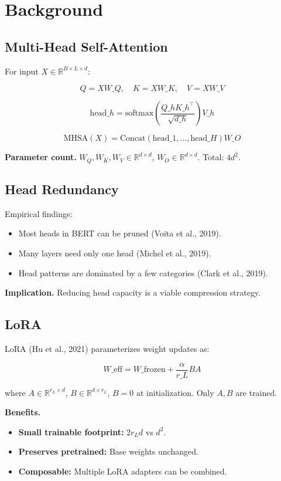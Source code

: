 
\section{Background}

\subsection{Multi-Head Self-Attention}

For input $X \in \mathbb{R}^{B \times L \times d}$:

\[
Q = X W\_Q, \quad K = X W\_K, \quad V = X W\_V
\]

\[
\text{head}\_h = \text{softmax}\!\left(\frac{Q\_h K\_h^\top}{\sqrt{d\_h}}\right) V\_h
\]

\[
\text{MHSA}(X) = \text{Concat}(\text{head}\_1, \dots, \text{head}\_H) W\_O
\]

\textbf{Parameter count.} $W_Q, W_K, W_V \in \mathbb{R}^{d \times d}$, 
$W_O \in \mathbb{R}^{d \times d}$. Total: $4 d^2$.

\subsection{Head Redundancy}

Empirical findings:

\begin{itemize}
\item Most heads in BERT can be pruned (Voita et al., 2019).
\item Many layers need only one head (Michel et al., 2019).
\item Head patterns are dominated by a few categories (Clark et al., 2019).

\end{itemize}
\textbf{Implication.} Reducing head capacity is a viable compression strategy.

\subsection{LoRA}

LoRA (Hu et al., 2021) parameterizes weight updates as:

\[
W\_\text{eff} = W\_\text{frozen} + \frac{\alpha}{r\_L} B A
\]

where $A \in \mathbb{R}^{r_L \times d}$, $B \in \mathbb{R}^{d \times r_L}$, 
$B = 0$ at initialization. Only $A, B$ are trained.

\textbf{Benefits.}
\begin{itemize}
\item \textbf{Small trainable footprint:} $2 r_L d$ vs $d^2$.
\item \textbf{Preserves pretrained:} Base weights unchanged.
\item \textbf{Composable:} Multiple LoRA adapters can be combined.

\end{itemize}
